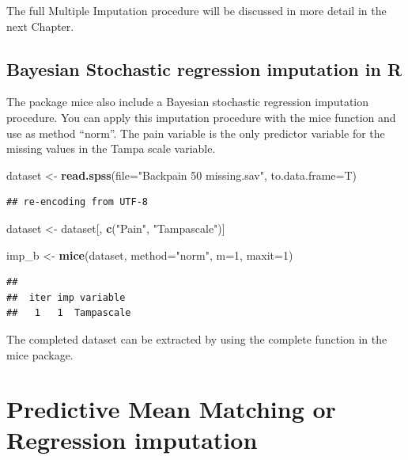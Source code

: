 \documentclass[]{book}
\newenvironment{Shaded}{\begin{snugshade}}{\end{snugshade}}
\newcommand{\KeywordTok}[1]{\textcolor[rgb]{0.13,0.29,0.53}{\textbf{#1}}}
\newcommand{\DataTypeTok}[1]{\textcolor[rgb]{0.13,0.29,0.53}{#1}}
\newcommand{\DecValTok}[1]{\textcolor[rgb]{0.00,0.00,0.81}{#1}}
\newcommand{\StringTok}[1]{\textcolor[rgb]{0.31,0.60,0.02}{#1}}
\newcommand{\NormalTok}[1]{#1}
\theoremstyle{definition}
\theoremstyle{definition}
\theoremstyle{definition}
\theoremstyle{remark}
\begin{document}
The full Multiple Imputation procedure will be discussed in more detail
in the next Chapter.

\subsection{Bayesian Stochastic regression imputation in
R}\label{bayesian-stochastic-regression-imputation-in-r}

The package mice also include a Bayesian stochastic regression
imputation procedure. You can apply this imputation procedure with the
mice function and use as method ``norm''. The pain variable is the only
predictor variable for the missing values in the Tampa scale variable.

\begin{Shaded}
\begin{Highlighting}[]
\NormalTok{dataset <-}\StringTok{ }\KeywordTok{read.spss}\NormalTok{(}\DataTypeTok{file=}\StringTok{"Backpain 50 missing.sav"}\NormalTok{, }\DataTypeTok{to.data.frame=}\NormalTok{T)}
\end{Highlighting}
\end{Shaded}

\begin{verbatim}
## re-encoding from UTF-8
\end{verbatim}

\begin{Shaded}
\begin{Highlighting}[]
\NormalTok{dataset <-}\StringTok{ }\NormalTok{dataset[, }\KeywordTok{c}\NormalTok{(}\StringTok{"Pain"}\NormalTok{, }\StringTok{"Tampascale"}\NormalTok{)]}

\NormalTok{imp_b <-}\StringTok{ }\KeywordTok{mice}\NormalTok{(dataset, }\DataTypeTok{method=}\StringTok{"norm"}\NormalTok{, }\DataTypeTok{m=}\DecValTok{1}\NormalTok{, }\DataTypeTok{maxit=}\DecValTok{1}\NormalTok{)}
\end{Highlighting}
\end{Shaded}

\begin{verbatim}
## 
##  iter imp variable
##   1   1  Tampascale
\end{verbatim}

The completed dataset can be extracted by using the complete function in
the mice package.

\section{Predictive Mean Matching or Regression
imputation}\label{predictive-mean-matching-or-regression-imputation}
\end{document}
